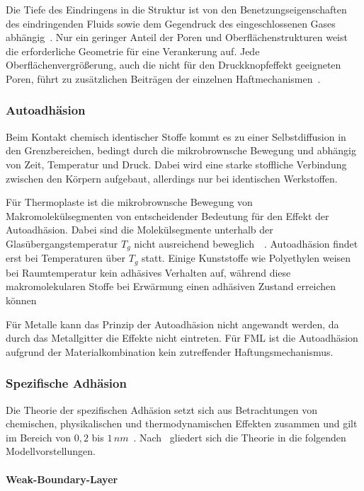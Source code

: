 Die Tiefe des Eindringens in die Struktur ist von den Benetzungseigenschaften des eindringenden Fluids sowie dem Gegendruck des eingeschlossenen Gases abhängig~\cite{Mittal.1999}.
Nur ein geringer Anteil der Poren und Oberflächenstrukturen weist die erforderliche Geometrie für eine Verankerung auf.
Jede Oberflächenvergrößerung, auch die nicht für den Druckknopfeffekt geeigneten Poren, führt zu zusätzlichen Beiträgen der einzelnen Haftmechanismen~\cite{Flock.b}.

\subsubsection{Autoadhäsion}\label{subsubsec:autoadhäsion}

Beim Kontakt chemisch identischer Stoffe kommt es zu einer Selbstdiffusion in den Grenzbereichen, bedingt durch die mikrobrownsche Bewegung und abhängig von Zeit, Temperatur und Druck.
Dabei wird eine starke stoffliche Verbindung zwischen den Körpern aufgebaut, allerdings nur bei identischen Werkstoffen.

Für Thermoplaste ist die mikrobrownsche Bewegung von Makromolekülsegmenten von entscheidender Bedeutung für den Effekt der Autoadhäsion.
Dabei sind die Molekülsegmente unterhalb der Glasübergangstemperatur $T_g$ nicht ausreichend beweglich~\cite{SEIDLER.1971}~.
Autoadhäsion findet erst bei Temperaturen über $T_g$ statt.
Einige Kunststoffe wie Polyethylen weisen bei Raumtemperatur kein adhäsives Verhalten auf, während diese makromolekularen Stoffe bei Erwärmung einen adhäsiven Zustand erreichen können \cite{SEIDLER.1971}

Für Metalle kann das Prinzip der Autoadhäsion nicht angewandt werden, da durch das Metallgitter die Effekte nicht eintreten.
Für FML ist die Autoadhäsion aufgrund der Materialkombination kein zutreffender Haftungsmechanismus.~\cite{Flock.b}

\subsubsection{Spezifische Adhäsion} \label{subsubsec:spez}

Die Theorie der spezifischen Adhäsion setzt sich aus Betrachtungen von chemischen, physikalischen und thermodynamischen Effekten zusammen und gilt im Bereich von $0,2$ bis $1\,nm$~.
Nach~\cite{Garbassi.1998} gliedert sich die Theorie in die folgenden Modellvorstellungen.

\paragraph{Weak-Boundary-Layer}

